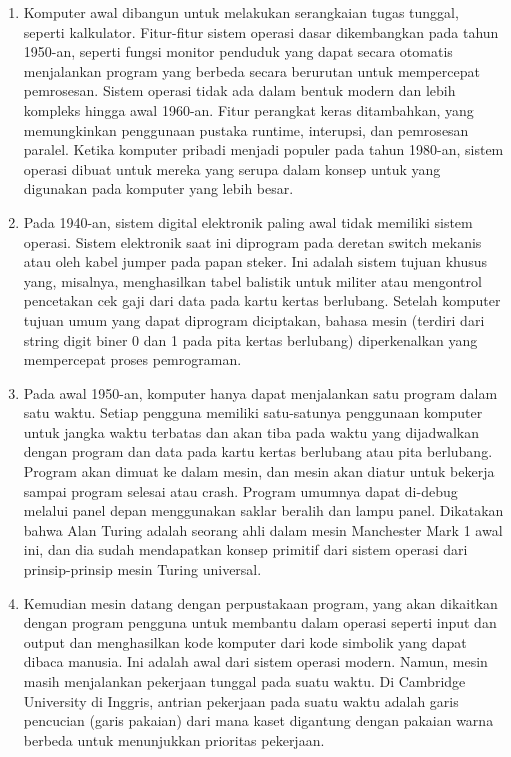 	\begin{enumerate}
		\item Komputer awal dibangun untuk melakukan serangkaian tugas tunggal, seperti kalkulator. Fitur-fitur sistem operasi dasar dikembangkan pada tahun 1950-an, seperti fungsi monitor penduduk yang dapat secara otomatis menjalankan program yang berbeda secara berurutan untuk mempercepat pemrosesan. Sistem operasi tidak ada dalam bentuk modern dan lebih kompleks hingga awal 1960-an. Fitur perangkat keras ditambahkan, yang memungkinkan penggunaan pustaka runtime, interupsi, dan pemrosesan paralel. Ketika komputer pribadi menjadi populer pada tahun 1980-an, sistem operasi dibuat untuk mereka yang serupa dalam konsep untuk yang digunakan pada komputer yang lebih besar.

		\item Pada 1940-an, sistem digital elektronik paling awal tidak memiliki sistem operasi. Sistem elektronik saat ini diprogram pada deretan switch mekanis atau oleh kabel jumper pada papan steker. Ini adalah sistem tujuan khusus yang, misalnya, menghasilkan tabel balistik untuk militer atau mengontrol pencetakan cek gaji dari data pada kartu kertas berlubang. Setelah komputer tujuan umum yang dapat diprogram diciptakan, bahasa mesin (terdiri dari string digit biner 0 dan 1 pada pita kertas berlubang) diperkenalkan yang mempercepat proses pemrograman.
		\item Pada awal 1950-an, komputer hanya dapat menjalankan satu program dalam satu waktu. Setiap pengguna memiliki satu-satunya penggunaan komputer untuk jangka waktu terbatas dan akan tiba pada waktu yang dijadwalkan dengan program dan data pada kartu kertas berlubang atau pita berlubang. Program akan dimuat ke dalam mesin, dan mesin akan diatur untuk bekerja sampai program selesai atau crash. Program umumnya dapat di-debug melalui panel depan menggunakan saklar beralih dan lampu panel. Dikatakan bahwa Alan Turing adalah seorang ahli dalam mesin Manchester Mark 1 awal ini, dan dia sudah mendapatkan konsep primitif dari sistem operasi dari prinsip-prinsip mesin Turing universal.
		\item Kemudian mesin datang dengan perpustakaan program, yang akan dikaitkan dengan program pengguna untuk membantu dalam operasi seperti input dan output dan menghasilkan kode komputer dari kode simbolik yang dapat dibaca manusia. Ini adalah awal dari sistem operasi modern. Namun, mesin masih menjalankan pekerjaan tunggal pada suatu waktu. Di Cambridge University di Inggris, antrian pekerjaan pada suatu waktu adalah garis pencucian (garis pakaian) dari mana kaset digantung dengan pakaian warna berbeda untuk menunjukkan prioritas pekerjaan. 


\end{enumerate}
